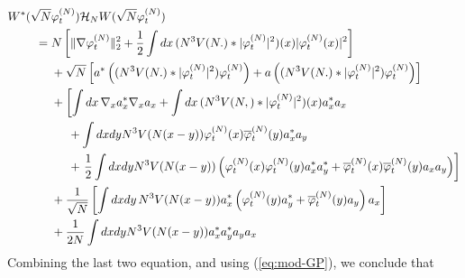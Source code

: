 \documentclass[11pt,a4paper,DIV11]{scrartcl}	%
\newcommand{\cH}{{\cal H}}
\begin{document}
 \[ \begin{split} W^* (\sqrt{N} &\varphi_t^{(N)}) \cH_N W (\sqrt{N} \varphi_t^{(N)})  \\
= \; & N \left[ \| \nabla \varphi_t^{(N)} \|_2^2 + \frac{1}{2} \int dx \, (N^3 V (N .) * |\varphi_t^{(N)}|^2) (x) |\varphi_t^{(N)} (x)|^2 \right] \\
&+ \sqrt{N} \left[  a^*\left( (N^3 V (N.) *| \varphi_t^{(N)}|^2) \varphi_t^{(N)} \right) + a\left( (N^3 V (N.) *| \varphi_t^{(N)}|^2) \varphi_t^{(N)} \right) \right] \\
&+ \left[ \int dx \, \nabla_x a_x^* \nabla_x a_x + \int dx \, (N^3 V (N,) * |\varphi_t^{(N)}|^2) (x) a_x^* a_x \right. \\ 
&\hspace{.5cm}+ \int dx dy N^3 V(N (x-y)) \varphi_t^{(N)} (x) \overline{\varphi}_t^{(N)} (y) a_x^* a_y \\
&\hspace{.5cm}+ \left.  \frac{1}{2} \int dx dy N^3 V(N (x-y)) \left( \varphi_t^{(N)} (x) \varphi_t^{(N)} (y) a_x^* a_y^* + 
\overline{\varphi}_t^{(N)} (x) \overline{\varphi}_t^{(N)} (y) a_x a_y \right) \right] \\
&+ \frac{1}{\sqrt{N}} \left[  \int dx dy \, N^3 V(N(x-y)) a_x^* \left( \varphi_t^{(N)} (y) a_y^* + \overline{\varphi}_t^{(N)} (y) a_y \right) a_x \right] \\
&+\frac{1}{2N} \int dx dy N^3 V(N (x-y)) a_x^* a_y^* a_y a_x \end{split} \]
Combining the last two equation, and using (\ref{eq:mod-GP}), we conclude that
\end{document}
